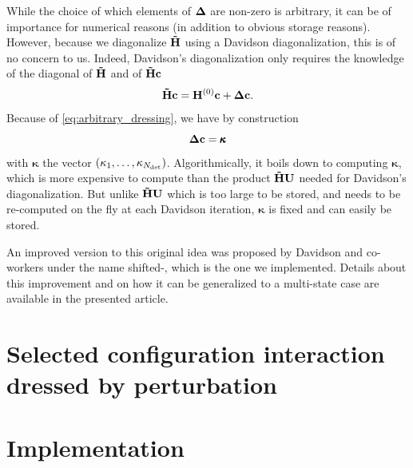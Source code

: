 \documentclass[./thesis.tex]{subfiles}
\begin{document}
While the choice of which elements of ${\bf \Delta}$ are non-zero is arbitrary, it can be of importance for numerical reasons (in addition to obvious storage reasons). However, because we diagonalize ${\bf \tilde H}$ using a Davidson diagonalization, this is of no concern to us. Indeed, Davidson's diagonalization only requires the knowledge of the diagonal of ${\bf \tilde H}$ and of ${\bf \tilde H} {\bf c}$ 
\begin{equation}
{\bf \tilde H} {\bf c} = {\bf H}^{(0)} {\bf c} + {\bf \Delta} {\bf c}.
\end{equation}
Because of \ref{eq:arbitrary_dressing}, we have by construction
\begin{equation}
{\bf \Delta} {\bf c} = {\pmb \kappa}
\end{equation}
with ${\pmb \kappa}$ the vector $\qty(\kappa_1, \ldots, \kappa_{{N_\text{det}}})$.
Algorithmically, it boils down to computing ${\pmb \kappa}$, which is more expensive to compute than the product \alert{${\bf \tilde H}{\bf U}$} needed for Davidson's diagonalization. But unlike \alert{${\bf \tilde H}{\bf U}$} which is too large to be stored, and needs to be re-computed on the fly at each Davidson iteration, ${\pmb \kappa}$ is fixed and can easily be stored.


An improved version to this original idea was proposed by Davidson and co-workers under the name shifted-\Bk,\cite{Nitzsche_1978a, Nitzsche_1978b, Rawlings_1983, Kozlowski_1995, Kozlowski_1994a, Kozlowski_1994b, Kozlowski_1994c} which is the one we implemented. Details about this improvement and on how it can be generalized to a multi-state case are available in the presented article.


\section{Selected configuration interaction dressed by perturbation}






\section{Implementation}
\end{document}
